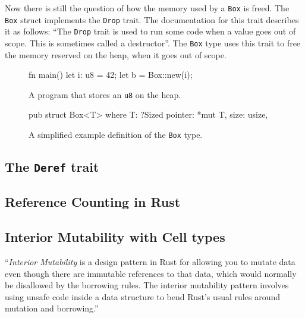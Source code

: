 \documentclass[twocolumn]{article}
\begin{document}
Now there is still the question of how the memory used by a \texttt{Box} is freed.
The \texttt{Box} struct implements the \texttt{Drop} trait.
The documentation for this trait describes it as follows: ``The \texttt{Drop} trait is used to run some code when a value goes out of scope. This is sometimes called a destructor''\cite{RustDoc-Drop}.
The \texttt{Box} type uses this trait to free the memory reserved on the heap, when it goes out of scope.


\begin{figure}
\begin{rustcode}
fn main() {
    let i: u8 = 42;
    let b = Box::new(i);
}
\end{rustcode}
\vspace{-2em}
\caption{A program that stores an \texttt{u8} on the heap.}
\label{box-example}
\end{figure}
\begin{figure}
\begin{rustcode}
pub struct Box<T> where T: ?Sized {
    pointer: *mut T,
    size: usize,
}
\end{rustcode}
\vspace{-2em}
\caption{A simplified example definition of the \texttt{Box} type.}
\label{box-definition}
\end{figure}
\subsection{The \texttt{Deref} trait}
\subsection{Reference Counting in Rust}
\subsection{Interior Mutability with Cell types}
``\textit{Interior Mutability} is a design pattern in Rust for allowing you to mutate data even though there are immutable references to that data, which would normally be disallowed by the borrowing rules. The interior mutability pattern involves using unsafe code inside a data structure to bend Rust's usual rules around mutation and borrowing.''\cite{RustBook-InteriorMutability}
\end{document}
